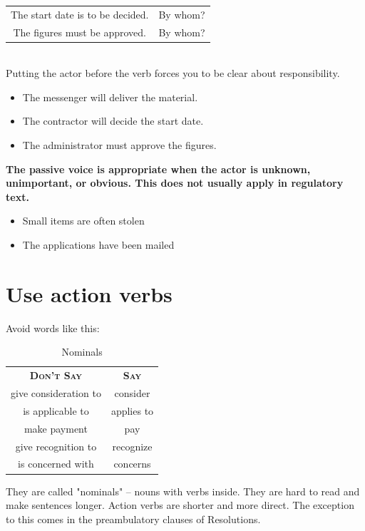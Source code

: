 \documentclass[12pt, letterpaper]{report}
\begin{document}
\begin{linenumbers}
\begin{tabular}{c|c}
            The start date is to be decided. & By whom?\\
            The figures must be approved. & By whom?
        \end{tabular}\\
        Putting the actor before the verb forces you to be clear about responsibility.
        \begin{itemize}
            \item     The messenger will deliver the material.
            \item    The contractor will decide the start date.
            \item    The administrator must approve the figures.
        \end{itemize}
        \textbf{The passive voice is appropriate when the actor is unknown, unimportant, or obvious. This does not usually apply in regulatory text. }
        \begin{itemize}
            \item Small items are often stolen
            \item The applications have been mailed
        \end{itemize}
    \section{Use action verbs}
    Avoid words like this:
    \begin{table}[h]
        \centering
        \begin{tabular}{c|c}
            \textsc{\textbf{Don't Say}} & \textsc{\textbf{Say}} \\
             give consideration to & consider\\
             is applicable to & applies to\\
             make payment & pay \\
             give recognition to & recognize \\
             is concerned with & concerns
        \end{tabular}
             \caption{Nominals}
	        \label{tab:nominals}
    \end{table}
    They are called "nominals" -- nouns with verbs inside. They are hard to read and make sentences longer. Action verbs are shorter and more direct. The exception to this comes in the preambulatory clauses of Resolutions.

\end{linenumbers}
\end{document}
